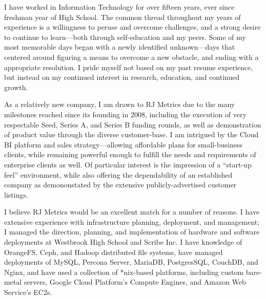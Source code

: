 


\begin{letterEnv}


    I have worked in Information Technology for over fifteen years, ever since freshman year of High School. The common thread
    throughout my years of experience is a willingness to peruse and overcome challenges, and a strong desire to continue
    to learn---both through self-education and my peers. Some of my most memorable days began with a newly identified
    unknown---days that centered around figuring a means to overcome a new obstacle, and ending with a appropriate resolution.
    I pride myself not based on my past resume experience, but instead on my continued interest in research, education, and
    continued growth.


    As a relatively new company, I am drawn to RJ Metrics due to the many milestones reached since its founding in 2008,
    including the execution of very respectable Seed, Series A, and Series B funding rounds, as well as demonstration of
    product value through the diverse customer-base. I am intrigued by the Cloud BI platform and sales strategy---allowing
    affordable plans for small-business clients, while remaining powerful enough to fulfill the needs and requirements of
    enterprise clients as well. Of particular interest is the impression of a ``start-up feel'' environment, while also
    offering the dependability of an established company as demononstated by the extensive publicly-advertised customer
    listings.


    I believe RJ Metrics would be an excellent match for a number of reasons. I have extensive experience with infrastructure
    planning, deployment, and management; I managed the direction, planning, and implementation of hardware and software
    deployments at Westbrook High School and Scribe Inc. I have knowledge of OrangeFS, Ceph, and Hadoop distributed file
    systems, have managed deployments of MySQL, Percona Server, MariaDB, PostgresSQL, CouchDB, and Nginx, and have used a
    collection of *nix-based platforms, including custom bare-metal servers, Google Cloud Platform's Compute Engines, and
    Amazon Web Service's EC2s.


\end{letterEnv}

